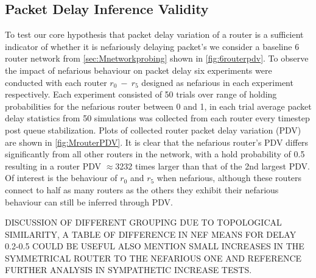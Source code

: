 \subsection*{Packet Delay Inference Validity}
To test our core hypothesis that packet delay variation of a router is a sufficient indicator of whether it is nefariously delaying packet's we consider a baseline 6 router network from \cref{sec:Mnetworkprobing} shown in \cref{fig:6routerpdv}. To observe the impact of nefarious behaviour on packet delay six experiments were conducted with each router $r_0\ -\ r_5$ designed as nefarious in each experiment respectively. Each experiment consisted of 50 trials over range of holding probabilities for the nefarious router between 0 and 1, in each trial average packet delay statistics from 50 simulations was collected from each router every timestep post queue stabilization. Plots of collected router packet delay variation (PDV) are shown in \cref{fig:MrouterPDV}. It is clear that the nefarious router's PDV differs significantly from all other routers in the network, with a hold probability of 0.5 resulting in a router PDV $\approx$3232 times larger than that of the 2nd largest PDV. Of interest is the behaviour of $r_0$ and $r_5$ when nefarious, although these routers connect to half as many routers as the others they exhibit their nefarious behaviour can still be inferred through PDV.\par
DISCUSSION OF DIFFERENT GROUPING DUE TO TOPOLOGICAL SIMILARITY, A TABLE OF DIFFERENCE IN NEF MEANS FOR DELAY 0.2-0.5 COULD BE USEFUL ALSO MENTION SMALL INCREASES IN THE SYMMETRICAL ROUTER TO THE NEFARIOUS ONE AND REFERENCE FURTHER ANALYSIS IN SYMPATHETIC INCREASE TESTS.

